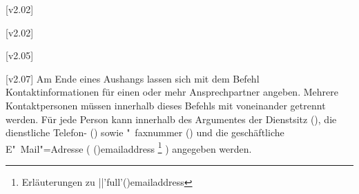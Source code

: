 \begin{DeclareEntity}{}
\begin{Declaration}
  {}
  [v2.02]
\begin{Declaration*}
  {}
\begin{Declaration*}
  {}
\begin{Declaration}
  {}
  [v2.02]
\begin{Declaration}
  {}
  [v2.05]
\begin{Declaration}
  {}
\printdeclarationlist
%
[v2.07]
Am Ende eines Aushangs lassen sich mit dem Befehl  
Kontaktinformationen für einen oder mehr Ansprechpartner angeben. Mehrere 
Kontaktpersonen müssen innerhalb dieses Befehls mit  voneinander 
getrennt werden. Für jede Person kann innerhalb des Argumentes der Dienstsitz 
(), die dienstliche Telefon- () sowie "~faxnummer
() und die geschäftliche E"~Mail"=Adresse (%
  \Macro(){emailaddress}%
  \footnote{Erläuterungen zu \Macro||'full'(){emailaddress}}%
) angegeben werden. 
\end{Declaration}
\end{Declaration}
\end{Declaration}
\end{Declaration*}
\end{Declaration*}
\end{Declaration}





\end{DeclareEntity}
